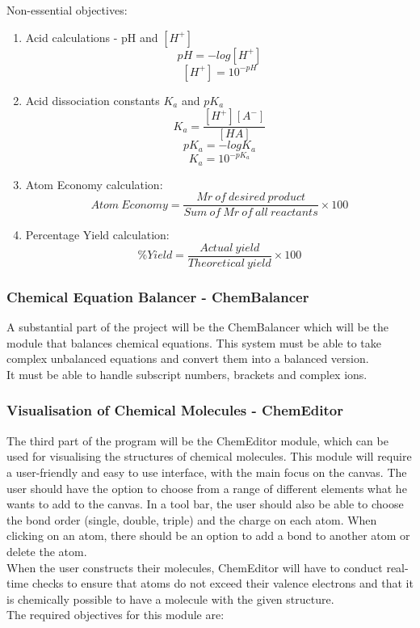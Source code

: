 \documentclass[a4paper,12pt]{article}
\begin{document}
\newpage

Non-essential objectives:
\begin{enumerate}
\item Acid calculations - pH and $[H^{+}]$
\[pH = -log[H^{+}]\]
\[[H^{+}] = 10^{-pH}\]

\item Acid dissociation constants $K_{a}$ and $pK_{a}$
\[K_{a} = \frac{[H^{+}][A^{-}]}{[HA]}\]
\[pK_{a} = -logK_{a}\]
\[K_{a} = 10^{-pK_{a}}\]

\item Atom Economy calculation:
\[Atom\: Economy = \frac{Mr\: of\: desired\: product}{Sum\: of\: Mr\: of\: all\: reactants}\times 100\]

\item Percentage Yield calculation:
\[\%Yield = \frac{Actual\: yield}{Theoretical\: yield} \times 100\]

\end{enumerate}

\newpage

\subsubsection{Chemical Equation Balancer - ChemBalancer}

A substantial part of the project will be the ChemBalancer which will be the module that balances chemical equations. This system must be able to take complex unbalanced equations and convert them into a balanced version.\\
It must be able to handle subscript numbers, brackets and complex ions.

\subsubsection{Visualisation of Chemical Molecules - ChemEditor}

The third part of the program will be the ChemEditor module, which can be used for visualising the structures of chemical molecules. This module will require a user-friendly and easy to use interface, with the main focus on the canvas. The user should have the option to choose from a range of different elements what he wants to add to the canvas. In a tool bar, the user should also be able to choose the bond order (single, double, triple) and the charge on each atom. When clicking on an atom, there should be an option to add a bond to another atom or delete the atom.\\
When the user constructs their molecules, ChemEditor will have to conduct real-time checks to ensure that atoms do not exceed their valence electrons and that it is chemically possible to have a molecule with the given structure. \\
The required objectives for this module are:\\
\end{document}
